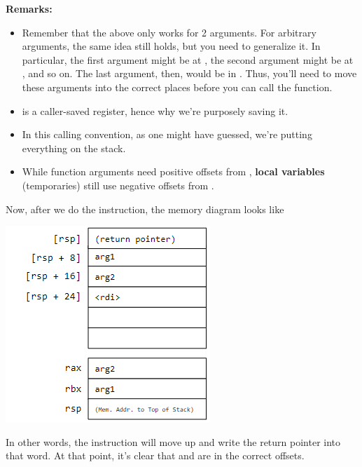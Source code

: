 \documentclass[letterpaper]{article}
\begin{document}
\textbf{Remarks:} 
\begin{itemize}
    \item Remember that the above only works for 2 arguments. For arbitrary arguments, the same idea still holds, but you need to generalize it. In particular, the first argument might be at \code{[rsp + 16]}, the second argument might be at \code{[rsp + 24]}, and so on. The last argument, then, would be in . Thus, you'll need to move these arguments into the correct places before you can call the function.
    \item {} is a caller-saved register, hence why we're purposely saving it. 
    \item In this calling convention, as one might have guessed, we're putting everything on the stack. 
    \item While function arguments need positive offsets from , \textbf{local variables} (temporaries) still use negative offsets from . 
\end{itemize}
Now, after we do the  instruction, the memory diagram looks like 
\begin{center}
    \includegraphics[scale=0.9]{../assets/mem6.png}
\end{center}
In other words, the  instruction will move  up and write the return pointer into that word. At that point, it's clear that  and  are in the correct offsets.
\end{document}
